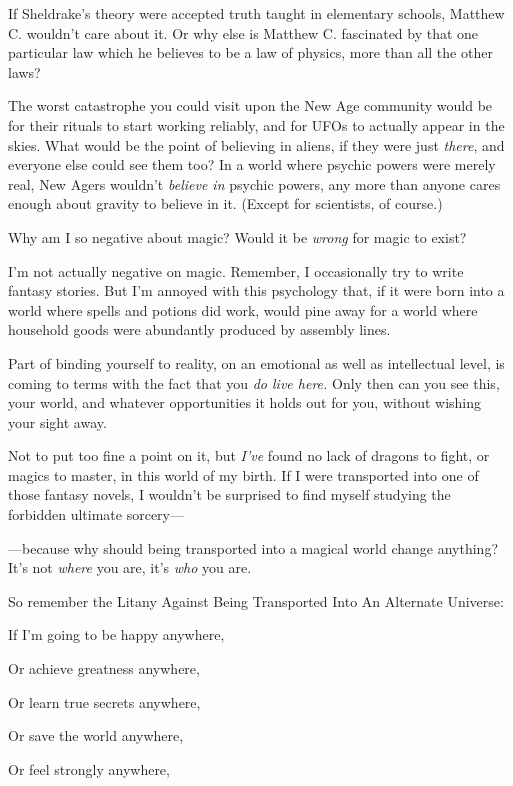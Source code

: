 {
 If Sheldrake's theory were accepted truth taught
in elementary schools, Matthew C. wouldn't care about
it. Or why else is Matthew C. fascinated by that one particular law
which he believes to be a law of physics, more than all the other
laws?}

{
 The worst catastrophe you could visit upon the New Age community
would be for their rituals to start working reliably, and for UFOs to
actually appear in the skies. What would be the point of believing in
aliens, if they were just \textit{there}, and everyone else could see
them too? In a world where psychic powers were merely real, New Agers
wouldn't \textit{believe in} psychic powers, any more
than anyone cares enough about gravity to believe in it. (Except for
scientists, of course.)}

{
 Why am I so negative about magic? Would it be \textit{wrong} for
magic to exist?}

{
 I'm not actually negative on magic. Remember, I
occasionally try to write fantasy stories. But I'm
annoyed with this psychology that, if it were born into a world where
spells and potions did work, would pine away for a world where
household goods were abundantly produced by assembly lines.}

{
 Part of binding yourself to reality, on an emotional as well as
intellectual level, is coming to terms with the fact that you
\textit{do live here.} Only then can you see this, your world, and
whatever opportunities it holds out for you, without wishing your sight
away.}

{
 Not to put too fine a point on it, but
\textit{I've} found no lack of dragons to fight, or
magics to master, in this world of my birth. If I were transported into
one of those fantasy novels, I wouldn't be surprised to
find myself studying the forbidden ultimate sorcery---}

{
 {}---because why should being transported into a magical world
change anything? It's not \textit{where} you are,
it's \textit{who} you are.}

{
 So remember the Litany Against Being Transported Into An Alternate
Universe:\newline
}

{
 If I'm going to be happy anywhere,}

{
 Or achieve greatness anywhere,}

{
 Or learn true secrets anywhere,}

{
 Or save the world anywhere,}

{
 Or feel strongly anywhere,}

